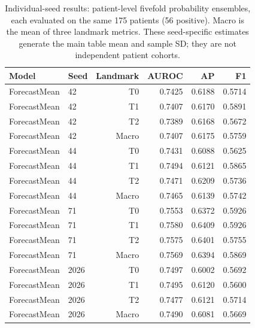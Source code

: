 \begin{table}[t]
\centering
\small
\caption{Individual-seed results: patient-level fivefold probability ensembles, each evaluated on the same 175 patients (56 positive). Macro is the mean of three landmark metrics. These seed-specific estimates generate the main table mean and sample SD; they are not independent patient cohorts.}
\label{tab:seedresults_forecast}
\begin{tabular}{llrrrr}
\toprule
Model & Seed & Landmark & AUROC & AP & F1 \\
\midrule
ForecastMean & 42 & T0 & 0.7425 & 0.6188 & 0.5714 \\
ForecastMean & 42 & T1 & 0.7407 & 0.6170 & 0.5891 \\
ForecastMean & 42 & T2 & 0.7389 & 0.6168 & 0.5672 \\
ForecastMean & 42 & Macro & 0.7407 & 0.6175 & 0.5759 \\
ForecastMean & 44 & T0 & 0.7431 & 0.6088 & 0.5625 \\
ForecastMean & 44 & T1 & 0.7494 & 0.6121 & 0.5865 \\
ForecastMean & 44 & T2 & 0.7471 & 0.6209 & 0.5736 \\
ForecastMean & 44 & Macro & 0.7465 & 0.6139 & 0.5742 \\
ForecastMean & 71 & T0 & 0.7553 & 0.6372 & 0.5926 \\
ForecastMean & 71 & T1 & 0.7580 & 0.6409 & 0.5926 \\
ForecastMean & 71 & T2 & 0.7575 & 0.6401 & 0.5755 \\
ForecastMean & 71 & Macro & 0.7569 & 0.6394 & 0.5869 \\
ForecastMean & 2026 & T0 & 0.7497 & 0.6002 & 0.5692 \\
ForecastMean & 2026 & T1 & 0.7495 & 0.6120 & 0.5600 \\
ForecastMean & 2026 & T2 & 0.7477 & 0.6121 & 0.5714 \\
ForecastMean & 2026 & Macro & 0.7490 & 0.6081 & 0.5669 \\
\bottomrule
\end{tabular}
\end{table}
